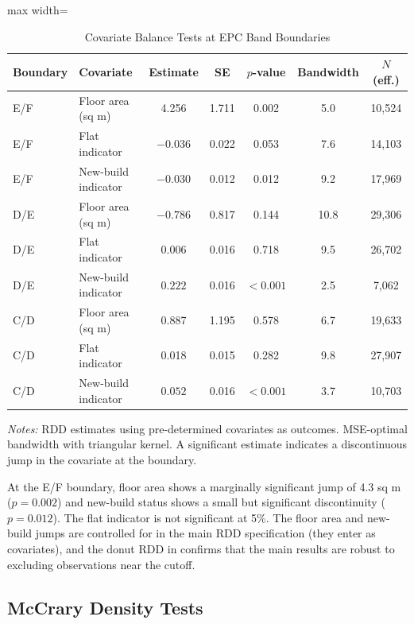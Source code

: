 \documentclass[12pt]{article}
\begin{document}
\begin{table}[H]
\centering
\caption{Covariate Balance Tests at EPC Band Boundaries}
\label{tab:balance}
\begin{adjustbox}{max width=\textwidth}
\begin{tabular}{llccccc}
\toprule
Boundary & Covariate & Estimate & SE & $p$-value & Bandwidth & $N$ (eff.) \\
\midrule
E/F & Floor area (sq m) & 4.256 & 1.711 & 0.002 & 5.0 & 10,524 \\
E/F & Flat indicator & $-0.036$ & 0.022 & 0.053 & 7.6 & 14,103 \\
E/F & New-build indicator & $-0.030$ & 0.012 & 0.012 & 9.2 & 17,969 \\
\addlinespace
D/E & Floor area (sq m) & $-0.786$ & 0.817 & 0.144 & 10.8 & 29,306 \\
D/E & Flat indicator & 0.006 & 0.016 & 0.718 & 9.5 & 26,702 \\
D/E & New-build indicator & $0.222$ & 0.016 & $<0.001$ & 2.5 & 7,062 \\
\addlinespace
C/D & Floor area (sq m) & 0.887 & 1.195 & 0.578 & 6.7 & 19,633 \\
C/D & Flat indicator & 0.018 & 0.015 & 0.282 & 9.8 & 27,907 \\
C/D & New-build indicator & $0.052$ & 0.016 & $<0.001$ & 3.7 & 10,703 \\
\bottomrule
\end{tabular}
\end{adjustbox}
\begin{minipage}{\textwidth}
\footnotesize
\textit{Notes:} RDD estimates using pre-determined covariates as outcomes. MSE-optimal bandwidth with triangular kernel. A significant estimate indicates a discontinuous jump in the covariate at the boundary.
\end{minipage}
\end{table}

At the E/F boundary, floor area shows a marginally significant jump of 4.3 sq m ($p = 0.002$) and new-build status shows a small but significant discontinuity ($p = 0.012$). The flat indicator is not significant at 5\%. The floor area and new-build jumps are controlled for in the main RDD specification (they enter as covariates), and the donut RDD in  confirms that the main results are robust to excluding observations near the cutoff.

\subsection{McCrary Density Tests}
\end{document}
